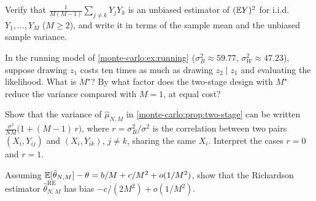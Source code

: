 \begin{notechapter}
\begin{exercise}\label{monte-carlo:exr:3}
Verify that $\frac{1}{M(M-1)}\sum_{j\neq k}Y_jY_k$ is an unbiased estimator of
$(\mathbb{E} Y)^2$ for i.i.d.\ $Y_1,\dots,Y_M$ ($M\geq2$), and write it in terms of the
sample mean and the unbiased sample variance.
\end{exercise}

\begin{exercise}\label{monte-carlo:exr:4}
In the running model of \cref{monte-carlo:ex:running} ($\sigma_B^2\approx59.77$,
$\sigma_W^2\approx47.23$), suppose drawing $z_1$ costs ten times as much as drawing
$z_2\mid z_1$ and evaluating the likelihood. What is $M^\star$? By what factor does the
two-stage design with $M^\star$ reduce the variance compared with $M = 1$, at equal
cost?
\end{exercise}

\begin{exercise}\label{monte-carlo:exr:5}
Show that the variance of $\hat\mu_{N,M}$ in \cref{monte-carlo:prop:two-stage} can be
written $\frac{\sigma^2}{NM}\bigl(1 + (M-1)\,r\bigr)$, where $r = \sigma_B^2/\sigma^2$ is the
correlation between two pairs $(X_i,Y_{ij})$ and $(X_i,Y_{ik})$, $j\neq k$, sharing the
same $X_i$. Interpret the cases $r = 0$ and $r = 1$.
\end{exercise}

\begin{exercise}\label{monte-carlo:exr:6}
Assuming $\mathbb{E}[\hat\theta_{N,M}] - \theta = b/M + c/M^2 + o(1/M^2)$, show that the
Richardson estimator $\hat\theta^{\mathrm{RE}}_{N,M}$ has bias $-c/(2M^2) + o(1/M^2)$.
\end{exercise}
\end{notechapter}
